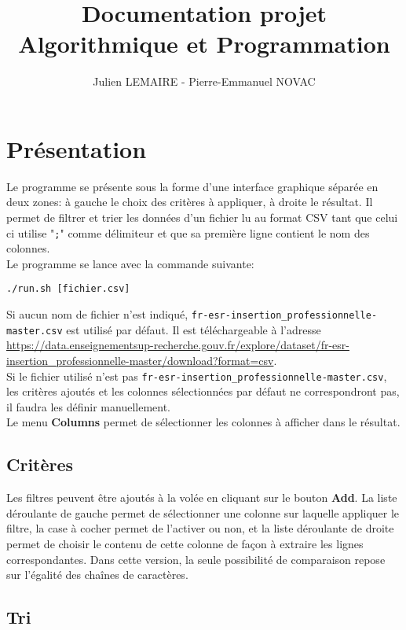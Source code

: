 \documentclass{article}
\title{Documentation projet Algorithmique et Programmation}
\author{Julien LEMAIRE - Pierre-Emmanuel NOVAC}
\begin{document}
\maketitle

\section{Présentation}

Le programme se présente sous la forme d'une interface graphique séparée en deux zones: à gauche le choix des critères à appliquer, à droite le résultat. Il permet de filtrer et trier les données d'un fichier lu au format CSV tant que celui ci utilise "\texttt{;}" comme délimiteur et que sa première ligne contient le nom des colonnes.\\
Le programme se lance avec la commande suivante:
\begin{lstlisting}
./run.sh [fichier.csv]
\end{lstlisting}
Si aucun nom de fichier n'est indiqué, \texttt{fr-esr-insertion\_professionnelle-master.csv} est utilisé par défaut. Il est téléchargeable à l'adresse \url{https://data.enseignementsup-recherche.gouv.fr/explore/dataset/fr-esr-insertion_professionnelle-master/download?format=csv}. \\
Si le fichier utilisé n'est pas \texttt{fr-esr-insertion\_professionnelle-master.csv}, les critères ajoutés et les colonnes sélectionnées par défaut ne correspondront pas, il faudra les définir manuellement.\\
Le menu \textbf{Columns} permet de sélectionner les colonnes à afficher dans le résultat.

\subsection{Critères}

Les filtres peuvent être ajoutés à la volée en cliquant sur le bouton \textbf{Add}. La liste déroulante de gauche permet de sélectionner une colonne sur laquelle appliquer le filtre, la case à cocher permet de l'activer ou non, et la liste déroulante de droite permet de choisir le contenu de cette colonne de façon à extraire les lignes correspondantes. Dans cette version, la seule possibilité de comparaison repose sur l'égalité des chaînes de caractères.

\subsection{Tri}
\end{document}
